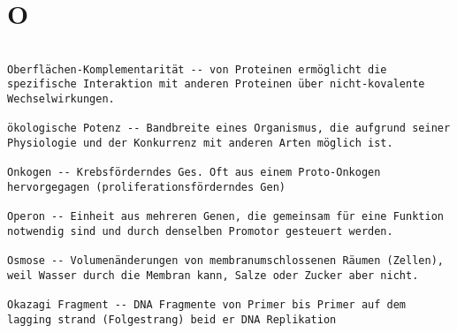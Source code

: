 \documentclass{article}
\begin{document}
\section{O}
\begin{verbatim}

Oberflächen-Komplementarität -- von Proteinen ermöglicht die spezifische Interaktion mit anderen Proteinen über nicht-kovalente Wechselwirkungen.

ökologische Potenz -- Bandbreite eines Organismus, die aufgrund seiner Physiologie und der Konkurrenz mit anderen Arten möglich ist.

Onkogen -- Krebsförderndes Ges. Oft aus einem Proto-Onkogen hervorgegagen (proliferationsförderndes Gen)

Operon -- Einheit aus mehreren Genen, die gemeinsam für eine Funktion notwendig sind und durch denselben Promotor gesteuert werden.

Osmose -- Volumenänderungen von membranumschlossenen Räumen (Zellen), weil Wasser durch die Membran kann, Salze oder Zucker aber nicht.

Okazagi Fragment -- DNA Fragmente von Primer bis Primer auf dem lagging strand (Folgestrang) beid er DNA Replikation
\end{verbatim}
\newpage
\end{document}
